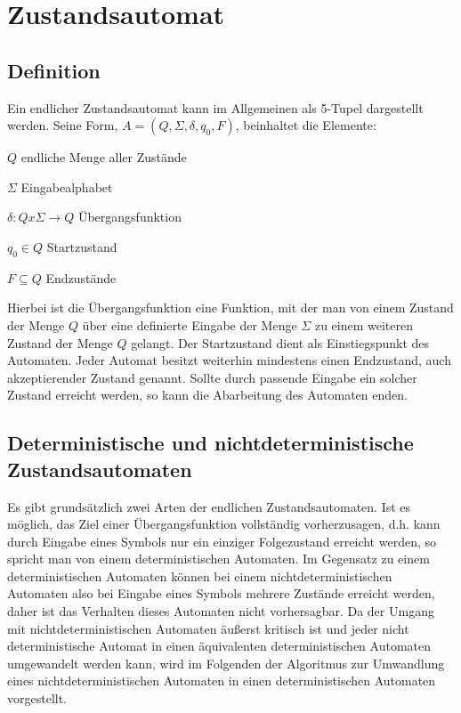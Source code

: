 \chapter{Zustandsautomat}

\section{Definition}

Ein endlicher Zustandsautomat kann im Allgemeinen als 5-Tupel dargestellt werden. Seine Form, $A=(Q, \Sigma, \delta, q_0, F)$, beinhaltet die Elemente:

$Q$ \quad endliche Menge aller Zust\"ande

$\Sigma$ \quad Eingabealphabet

$\delta: Q x \Sigma \rightarrow Q$ \quad \"Ubergangsfunktion

$q_0 \in  Q$ \quad Startzustand

$F \subseteq Q$ \quad Endzust\"ande

Hierbei ist die \"Ubergangsfunktion eine Funktion, mit der man von einem Zustand der Menge $Q$ \"uber eine definierte Eingabe der Menge $\Sigma$ zu einem weiteren Zustand der Menge $Q$ gelangt. Der Startzustand dient als Einstiegspunkt des Automaten. Jeder Automat besitzt weiterhin mindestens einen Endzustand, auch akzeptierender Zustand genannt. Sollte durch passende Eingabe ein solcher Zustand erreicht werden, so kann die Abarbeitung des Automaten enden.

\section{Deterministische und nichtdeterministische Zustandsautomaten}

Es gibt grunds\"atzlich zwei Arten der endlichen Zustandsautomaten. Ist es m\"oglich, das Ziel einer \"Ubergangsfunktion vollst\"andig vorherzusagen, d.h. kann durch Eingabe eines Symbols nur ein einziger Folgezustand erreicht werden, so spricht man von einem deterministischen Automaten. Im Gegensatz zu einem deterministischen Automaten k\"onnen bei einem nichtdeterministischen Automaten also bei Eingabe eines Symbols mehrere Zust\"ande erreicht werden, daher ist das Verhalten dieses Automaten nicht vorhersagbar. Da der Umgang mit nichtdeterministischen Automaten \"außerst kritisch ist und jeder nicht deterministische Automat in einen \"aquivalenten deterministischen Automaten umgewandelt werden kann, wird im Folgenden der Algoritmus zur Umwandlung eines nichtdeterministischen Automaten in einen deterministischen Automaten vorgestellt.

